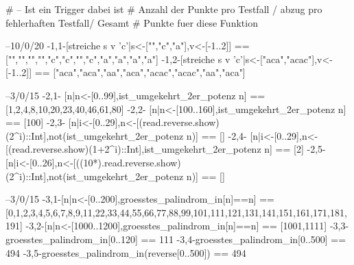 # -- Ist ein Trigger dabei ist
# Anzahl der Punkte pro Testfall / abzug pro fehlerhaften Testfall/ Gesamt
# Punkte fuer diese Funktion


--10/0/20
{-1,1-}[streiche s v 'c'|s<-["","c","a"],v<-[-1..2]] == ["","","","","c","c","","c","a","a","a","a"]
{-1,2-}[streiche s v 'c'|s<-["aca","acac"],v<-[-1..2]] == ["aca","aca","aa","aca","acac","acac","aa","aca"]

--3/0/15
{-2,1-} [n|n<-[0..99],ist_umgekehrt_2er_potenz n] == [1,2,4,8,10,20,23,40,46,61,80]
{-2,2-} [n|n<-[100..160],ist_umgekehrt_2er_potenz n] == [100]
{-2,3-} [n|i<-[0..29],n<-[(read.reverse.show)(2^i)::Int],not(ist_umgekehrt_2er_potenz n)] == []
{-2,4-} [n|i<-[0..29],n<-[(read.reverse.show)(1+2^i)::Int],ist_umgekehrt_2er_potenz n] == [2]
{-2,5-} [n|i<-[0..26],n<-[((10*).read.reverse.show)(2^i)::Int],not(ist_umgekehrt_2er_potenz n)] == []


--3/0/15
{-3,1-}[n|n<-[0..200],groesstes_palindrom_in[n]==n] == [0,1,2,3,4,5,6,7,8,9,11,22,33,44,55,66,77,88,99,101,111,121,131,141,151,161,171,181,191]
{-3,2-}[n|n<-[1000..1200],groesstes_palindrom_in[n]==n] == [1001,1111]
{-3,3-}groesstes_palindrom_in[0..120] == 111
{-3,4-}groesstes_palindrom_in[0..500] == 494
{-3,5-}groesstes_palindrom_in(reverse[0..500]) == 494